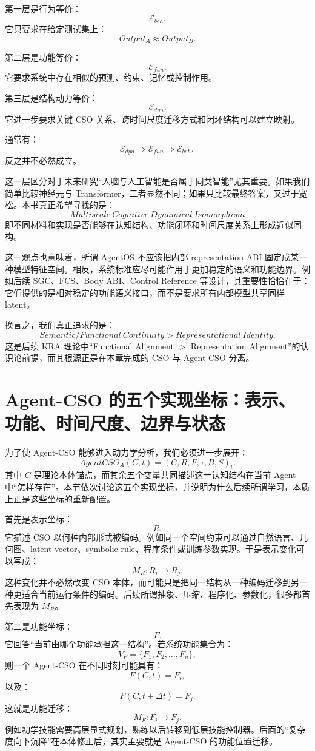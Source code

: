 第一层是行为等价：
\[
\mathcal E_{beh}.
\]
它只要求在给定测试集上：
\[
Output_A\approx Output_B.
\]

第二层是功能等价：
\[
\mathcal E_{fun}.
\]
它要求系统中存在相似的预测、约束、记忆或控制作用。

第三层是结构动力等价：
\[
\mathcal E_{dyn}.
\]
它进一步要求关键 CSO 关系、跨时间尺度迁移方式和闭环结构可以建立映射。

通常有：
\[
\mathcal E_{dyn}
\Rightarrow
\mathcal E_{fun}
\Rightarrow
\mathcal E_{beh},
\]
反之并不必然成立。

这一层区分对于未来研究“人脑与人工智能是否属于同类智能”尤其重要。如果我们简单比较神经元与 Transformer，二者显然不同；如果只比较最终答案，又过于宽松。本书真正希望寻找的是：
\[
\boxed{
Multiscale\ Cognitive\ Dynamical\ Isomorphism
}
\]
即不同材料和实现是否能够在认知结构、功能闭环和时间尺度关系上形成近似同构。

这一观点也意味着，所谓 AgentOS 不应该把内部 representation ABI 固定成某一种模型特征空间。相反，系统标准应尽可能作用于更加稳定的语义和功能边界。例如后续 SGC、FCS、Body ABI、Control Reference 等设计，其重要性恰恰在于：它们提供的是相对稳定的功能语义接口，而不是要求所有内部模型共享同样 latent。

换言之，我们真正追求的是：
\[
\boxed{
Semantic/Functional\ Continuity
>
Representational\ Identity.
}
\]
这是后续 KRA 理论中“Functional Alignment $>$ Representation Alignment”的认识论前提，而其根源正是在本章完成的 CSO 与 Agent-CSO 分离。

\section{Agent-CSO 的五个实现坐标：表示、功能、时间尺度、边界与状态}

为了使 Agent-CSO 能够进入动力学分析，我们必须进一步展开：
\[
AgentCSO_A(C,t)
=
(C,R,F,\tau,B,S)_t.
\]
其中 $C$ 是理论本体锚点，而其余五个变量共同描述这一认知结构在当前 Agent 中“怎样存在”。本节依次讨论这五个实现坐标，并说明为什么后续所谓学习，本质上正是这些坐标的重新配置。

首先是表示坐标：
\[
R.
\]
它描述 CSO 以何种内部形式被编码。例如同一个空间约束可以通过自然语言、几何图、latent vector、symbolic rule、程序条件或训练参数实现。于是表示变化可以写成：
\[
M_R:
R_i
\rightarrow
R_j.
\]
这种变化并不必然改变 CSO 本体，而可能只是把同一结构从一种编码迁移到另一种更适合当前运行条件的编码。后续所谓抽象、压缩、程序化、参数化，很多都首先表现为 $M_R$。

第二是功能坐标：
\[
F.
\]
它回答“当前由哪个功能承担这一结构”。若系统功能集合为：
\[
V_F
=
\{F_1,F_2,\ldots,F_n\},
\]
则一个 Agent-CSO 在不同时刻可能具有：
\[
F(C,t)=F_i,
\]
以及：
\[
F(C,t+\Delta t)=F_j.
\]
这就是功能迁移：
\[
M_F:
F_i
\rightarrow
F_j.
\]
例如初学技能需要高层显式规划，熟练以后转移到低层技能控制器。后面的“复杂度向下沉降”在本体修正后，其实主要就是 Agent-CSO 的功能位置迁移。

